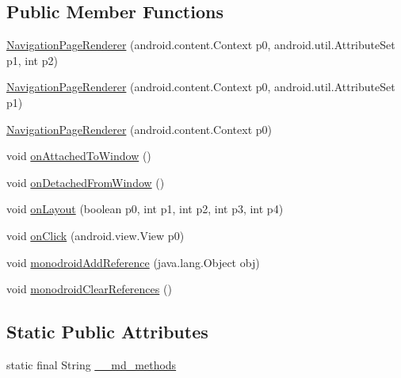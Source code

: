 \subsection*{Public Member Functions}
\begin{CompactItemize}
\item 
\hyperlink{classmd5270abb39e60627f0f200893b490a1ade_1_1_navigation_page_renderer_70255e5c28ffb8f5ee71fc6f55817d58}{NavigationPageRenderer} (android.content.Context p0, android.util.AttributeSet p1, int p2)
\item 
\hyperlink{classmd5270abb39e60627f0f200893b490a1ade_1_1_navigation_page_renderer_86cfa0a4388feb033448833e6020bfed}{NavigationPageRenderer} (android.content.Context p0, android.util.AttributeSet p1)
\item 
\hyperlink{classmd5270abb39e60627f0f200893b490a1ade_1_1_navigation_page_renderer_5a771deb633fd26fa2d3abbf974fb1ac}{NavigationPageRenderer} (android.content.Context p0)
\item 
void \hyperlink{classmd5270abb39e60627f0f200893b490a1ade_1_1_navigation_page_renderer_12cd8c12878acf8cb8fb5d4f96c24323}{onAttachedToWindow} ()
\item 
void \hyperlink{classmd5270abb39e60627f0f200893b490a1ade_1_1_navigation_page_renderer_4d03da66e9434ab5b96541f9a8a34830}{onDetachedFromWindow} ()
\item 
void \hyperlink{classmd5270abb39e60627f0f200893b490a1ade_1_1_navigation_page_renderer_4a98b6254362130c58ffc36a0a18744a}{onLayout} (boolean p0, int p1, int p2, int p3, int p4)
\item 
void \hyperlink{classmd5270abb39e60627f0f200893b490a1ade_1_1_navigation_page_renderer_7e527b733de3bf06dd5a960f472265d5}{onClick} (android.view.View p0)
\item 
void \hyperlink{classmd5270abb39e60627f0f200893b490a1ade_1_1_navigation_page_renderer_876162ea80dae791f8a70b5bc12ee81c}{monodroidAddReference} (java.lang.Object obj)
\item 
void \hyperlink{classmd5270abb39e60627f0f200893b490a1ade_1_1_navigation_page_renderer_61d42127ac3ca068adc349d6a33af47a}{monodroidClearReferences} ()
\end{CompactItemize}
\subsection*{Static Public Attributes}
\begin{CompactItemize}
\item 
static final String \hyperlink{classmd5270abb39e60627f0f200893b490a1ade_1_1_navigation_page_renderer_f9b71b148669bb50bafafc240c856788}{\_\-\_\-md\_\-methods}
\end{CompactItemize}

